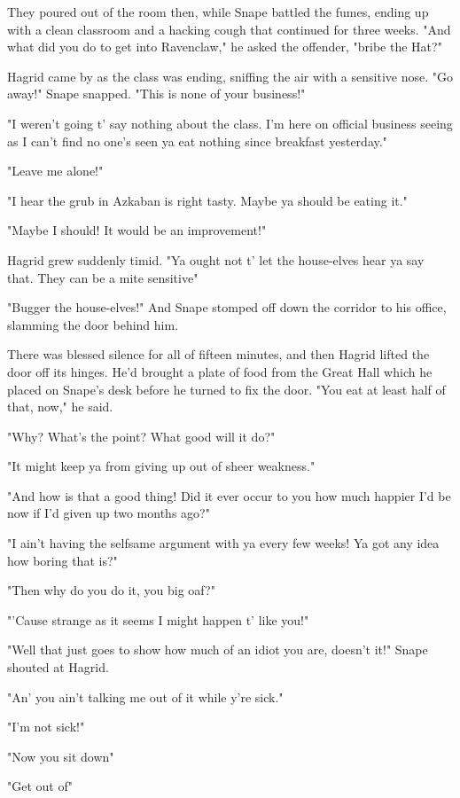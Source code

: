 They poured out of the room then, while Snape battled the fumes, ending up with a clean classroom and a hacking cough that continued for three weeks. "And what did you do to get into Ravenclaw," he asked the offender, "bribe the Hat?"

Hagrid came by as the class was ending, sniffing the air with a sensitive nose. "Go away!" Snape snapped. "This is none of your business!"

"I weren't going t' say nothing about the class. I'm here on official business seeing as I can't find no one's seen ya eat nothing since breakfast yesterday."

"Leave me alone!"

"I hear the grub in Azkaban is right tasty. Maybe ya should be eating it."

"Maybe I should! It would be an improvement!"

Hagrid grew suddenly timid. "Ya ought not t' let the house-elves hear ya say that. They can be a mite sensitive{\el}"

"Bugger the house-elves!" And Snape stomped off down the corridor to his office, slamming the door behind him.

There was blessed silence for all of fifteen minutes, and then Hagrid lifted the door off its hinges. He'd brought a plate of food from the Great Hall which he placed on Snape's desk before he turned to fix the door. "You eat at least half of that, now," he said.

"Why? What's the point? What good will it do?"

"It might keep ya from giving up out of sheer weakness."

"And how is that a good thing! Did it ever occur to you how much happier I'd be now if I'd given up two months ago?"

"I ain't having the selfsame argument with ya every few weeks! Ya got any idea how boring that is?"

"Then why do you do it, you big oaf?"

"'Cause strange as it seems I might happen t' like you!"

"Well that just goes to show how much of an idiot you are, doesn't it!" Snape shouted at Hagrid.

"An' you ain't talking me out of it while y're sick."

"I'm not sick!"

"Now you sit down{\el}"

"Get out of{\el}"

